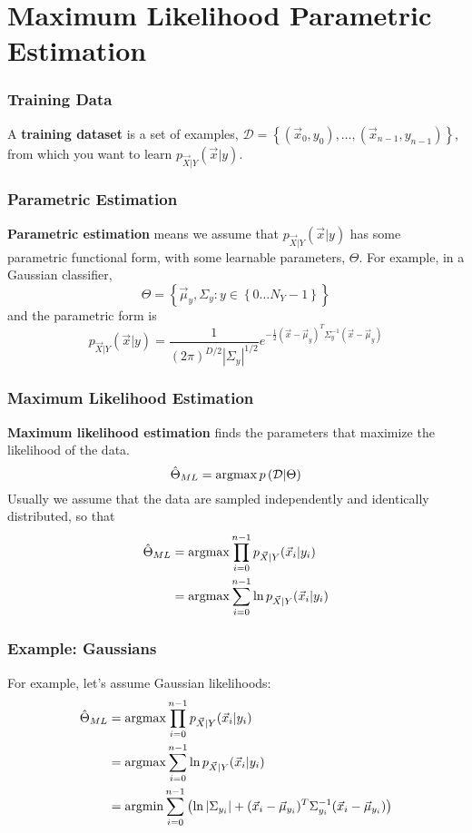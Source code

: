 \documentclass{beamer}
\newcommand{\argmax}{\operatornamewithlimits{argmax}}
\newcommand{\argmin}{\operatornamewithlimits{argmin}}
\begin{document}
\section[ML]{Maximum Likelihood Parametric Estimation}
\setcounter{subsection}{1}

\begin{frame}
  \frametitle{Training Data}

  A {\bf training dataset} is a set of examples, ${\mathcal
    D}=\left\{(\vec{x}_0,y_0),\ldots,(\vec{x}_{n-1},y_{n-1})\right\}$, from
  which you want to learn $p_{\vec{X}|Y}(\vec{x}|y)$.
  
\end{frame}

\begin{frame}
  \frametitle{Parametric Estimation}

  {\bf Parametric estimation} means we assume that
  $p_{\vec{X}|Y}(\vec{x}|y)$ has some parametric functional form, with
  some learnable parameters, $\Theta$.  For example, in a Gaussian classifier,
  \[
  \Theta =
  \left\{\vec\mu_{y},\Sigma_{y}:y\in\left\{0\ldots N_Y-1\right\}\right\}
  \]
  and the parametric form is
  \[
  p_{\vec{X}|Y}(\vec{x}|y)=
  \frac{1}{(2\pi)^{D/2}|\Sigma_y|^{1/2}}
  e^{-\frac{1}{2}(\vec{x}-\vec\mu_y)^T\Sigma_y^{-1}(\vec{x}-\vec\mu_y)}
  \]
\end{frame}

\begin{frame}
  \frametitle{Maximum Likelihood Estimation}

  {\bf Maximum likelihood estimation} finds the parameters that
  maximize the likelihood of the data.
  \begin{displaymath}
    \hat{\Theta}_{ML} = \argmax p\left({\mathcal D}|\Theta\right)
  \end{displaymath}
  Usually we assume that the data are sampled independently and
  identically distributed, so that
  \begin{align*}
    \hat{\Theta}_{ML} &= \argmax \prod_{i=0}^{n-1}p_{\vec{X}|Y}(\vec{x}_i|y_i)\\
    &= \argmax \sum_{i=0}^{n-1}\ln p_{\vec{X}|Y}(\vec{x}_i|y_i)
  \end{align*}
\end{frame}

\begin{frame}
  \frametitle{Example: Gaussians}

  For example, let's assume Gaussian likelihoods:
  \begin{align*}
    \hat{\Theta}_{ML} &= \argmax \prod_{i=0}^{n-1}p_{\vec{X}|Y}(\vec{x}_i|y_i)\\
    &= \argmax \sum_{i=0}^{n-1}\ln p_{\vec{X}|Y}(\vec{x}_i|y_i)\\
    &= \argmin \sum_{i=0}^{n-1}\left(\ln|\Sigma_{y_i}|
    +(\vec{x}_i-\vec\mu_{y_i})^T\Sigma_{y_i}^{-1}(\vec{x}_i-\vec\mu_{y_i})\right)
  \end{align*}
\end{frame}
\end{document}
